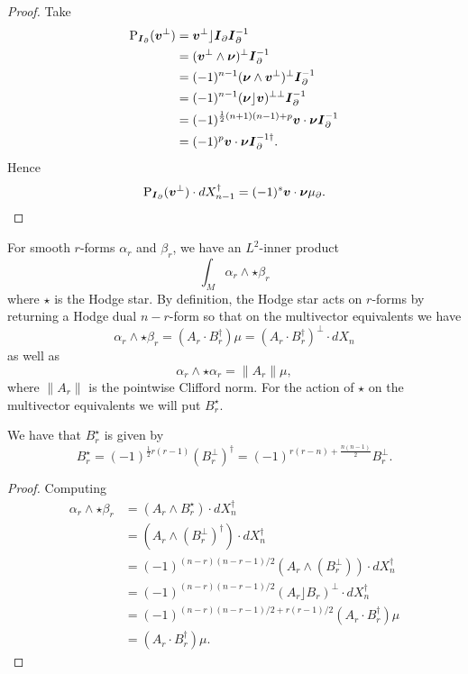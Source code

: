 \begin{proof}
Take
\begin{align*}
\operatorname{P}_{\boldsymbol{I}_\partial}(\boldsymbol{v}^\perp) &= \boldsymbol{v}^\perp \rfloor \boldsymbol{I}_\partial \boldsymbol{I}_\partial^{-1}\\
    &= (\boldsymbol{v}^\perp \wedge \boldsymbol{\nu})^\perp \boldsymbol{I}_\partial^{-1}\\
    &= (-1)^{n-1} (\boldsymbol{\nu} \wedge \boldsymbol{v}^\perp)^\perp \boldsymbol{I}_\partial^{-1}\\
    &= (-1)^{n-1} (\boldsymbol{\nu} \rfloor \boldsymbol{v})^{\perp \perp} \boldsymbol{I}_\partial^{-1}\\
    &= (-1)^{\frac{1}{2}(n+1)(n-1)+p} \boldsymbol{v}\cdot \boldsymbol{\nu} \boldsymbol{I}_\partial^{-1}\\
    &= (-1)^p \boldsymbol{v} \cdot \boldsymbol{\nu} \boldsymbol{I}_\partial^{-1 \dagger}.
\end{align*}
Hence 
\[
\operatorname{P}_{\boldsymbol{I}_\partial}(\boldsymbol{v}^\perp) \cdot dX_{n-1}^\dagger =(-1)^s \boldsymbol{v} \cdot \boldsymbol{\nu} \mu_\partial.
\]
\end{proof}

For smooth $r$-forms $\alpha_r$ and $\beta_r$, we have an $L^2$-inner product 
\begin{equation}
\int_M \alpha_r \wedge \star \beta_r 
\end{equation}
where $\star$ is the Hodge star. By definition, the Hodge star acts on $r$-forms by returning a Hodge dual $n-r$-form so that on the multivector equivalents we have
\begin{equation}
\alpha_r \wedge \star \beta_r  = (A_r\cdot B_r^\dagger)\mu = (A_r \cdot B_r^\dagger)^\perp \cdot dX_n
\end{equation}
as well as
\begin{equation}
    \alpha_r \wedge \star \alpha_r = \|A_r\|\mu,
\end{equation}
where $\|A_r\|$ is the pointwise Clifford norm. For the action of $\star$ on the multivector equivalents we will put $B_r^\star$. 

\begin{proposition}
We have that $B_r^\star$ is given by
\begin{equation}
B_r^\star =(-1)^{\frac{1}{2}r(r-1)} (B_r^\perp)^\dagger = (-1)^{r(r-n)+\frac{n(n-1)}{2}} B_r^\perp.
\end{equation}
\label{prop:multivector_hodge_star}
\end{proposition}
\begin{proof}
Computing
\begin{align*}
    \alpha_r \wedge \star \beta_r &= (A_r \wedge B_r^\star) \cdot dX_n^\dagger\\
    &=(A_r \wedge (B_r^\perp)^\dagger ) \cdot dX_n^\dagger\\
    &=(-1)^{(n-r)(n-r-1)/2} (A_r \wedge (B_r^\perp)) \cdot dX_n^\dagger\\
    &=(-1)^{(n-r)(n-r-1)/2} (A_r \rfloor B_r)^\perp \cdot dX_n^\dagger\\
    &=(-1)^{(n-r)(n-r-1)/2+r(r-1)/2} (A_r \cdot B_r^\dagger) \mu\\
    &=(A_r \cdot B_r^\dagger) \mu.
\end{align*}
\end{proof}

